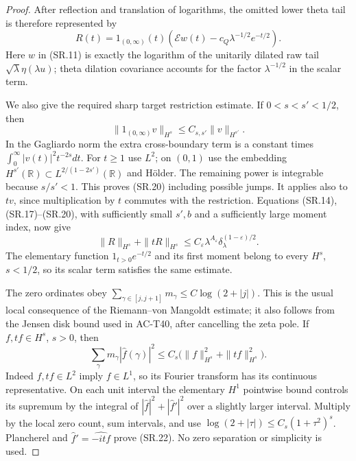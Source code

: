\begin{proof}
After reflection and translation of logarithms, the
omitted lower theta tail is therefore represented by
\[
 R(t)=1_{(0,\infty)}(t)
       \left(\mathcal Ew(t)-c_Q\lambda^{-1/2}e^{-t/2}\right).
                                                        \tag{SR.19}
\]
Here $w$ in (SR.11) is exactly the logarithm of the
unitarily dilated raw tail $\sqrt\lambda\eta(\lambda u)$;
theta dilation covariance accounts for the factor
$\lambda^{-1/2}$ in the scalar term.

We also give the required sharp target restriction
estimate.  If $0<s<s'<1/2$, then
\[
           \|1_{(0,\infty)}v\|_{H^s}
                                     \leq C_{s,s'}\|v\|_{H^{s'}}.
                                                        \tag{SR.20}
\]
In the Gagliardo norm the extra cross-boundary term is
a constant times $\int_0^\infty|v(t)|^2t^{-2s}dt$.
For $t\geq1$ use $L^2$; on $(0,1)$ use the
embedding $H^{s'}(\mathbb R)\subset
L^{2/(1-2s')}(\mathbb R)$ and H\"older.
The remaining power is integrable because $s/s'<1$.
This proves (SR.20) including possible jumps.
It applies also to $tv$, since multiplication by $t$
commutes with the restriction.
Equations (SR.14), (SR.17)--(SR.20), with sufficiently
small $s',b$ and a sufficiently large moment index,
now give
\[
 \|R\|_{H^s}+\|tR\|_{H^s}
      \leq C_\varepsilon\lambda^{A_\varepsilon}
                     \delta_\lambda^{(1-\varepsilon)/2}.
                                                        \tag{SR.21}
\]
The elementary function $1_{t>0}e^{-t/2}$ and its
first moment belong to every $H^s$, $s<1/2$, so
its scalar term satisfies the same estimate.

The zero ordinates obey
$\sum_{\gamma\in[j,j+1]}m_\gamma
\leq C\log(2+|j|)$.
This is the usual local consequence of the
Riemann--von Mangoldt estimate; it also follows from
the Jensen disk bound used in AC-T40, after cancelling
the zeta pole.  If $f,tf\in H^s$, $s>0$, then
\[
 \sum_\gamma m_\gamma|\widehat f(\gamma)|^2
    \leq C_s\bigl(\|f\|_{H^s}^2+\|tf\|_{H^s}^2\bigr).
                                                        \tag{SR.22}
\]
Indeed $f,tf\in L^2$ imply $f\in L^1$, so its
Fourier transform has its continuous representative.
On each unit interval the elementary $H^1$ pointwise
bound controls its supremum by the integral of
$|\widehat f|^2+|\widehat f'|^2$ over a slightly
larger interval.  Multiply by the local zero count,
sum intervals, and use
$\log(2+|\tau|)\leq C_s(1+\tau^2)^s$.
Plancherel and $\widehat f'=\widehat{-itf}$ prove
(SR.22).  No zero separation or simplicity is used.


\end{proof}
